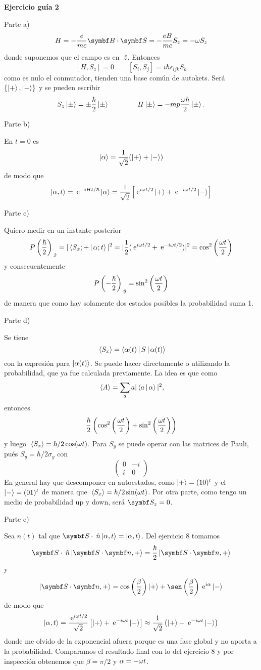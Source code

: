 \documentclass[10pt,oneside]{CBFT_book}
\begin{document}
\begin{ejemplo}{\bf Ejercicio guía 2}

Parte a)
\[
	H = -\frac{e}{mc} \pe{B}{S} = -\frac{eB}{mc} S_z = - \omega S_z
\]
donde suponemos que el campo es en $\:\hat{z}$.
Entonces
\[
	[H,S_z] = 0 \qquad [S_i,S_j] = i \hbar \epsilon_{ijk} S_k
\]
como es nulo el conmutador, tienden una base común de autokets. Será $\{ \Ket{+}, \Ket{-} \}$
y se pueden escribir
\[
	S_z \Ket{\pm} = \pm \frac{\hbar}{2}\Ket{\pm} \qquad \qquad 
	H \Ket{\pm} = -mp \frac{ \omega \hbar }{2} \Ket{\pm}.
\]

Parte b)

En $t=0$ es 
\[
	\Ket{\alpha} = \frac{1}{\sqrt{2}} ( \Ket{+} + \Ket{-} )
\]
de modo que
\[
	\Ket{\alpha,t} = \:\mathrm{e}^{ - i H t / \hbar } \Ket{\alpha} =
	\frac{1}{\sqrt{2}} \left[ \:\mathrm{e}^{ i \omega t / 2 } \Ket{+} + \:\mathrm{e}^{ -i \omega t / 2 } \Ket{-} \right] 
\]


Parte c)

Quiero medir en un instante posterior
\[
	P\left(\frac{\hbar}{2}\right)_{\:\hat{x}} = |\Braket{S_x;+|\alpha;t}|^2 = 
	| \frac{1}{2}( \:\mathrm{e}^{i \omega t / 2} +  \:\mathrm{e}^{-i \omega t / 2} ) |^2 = \cos^2\left( \frac{ \omega t }{ 2 } \right)
\]
y consecuentemente
\[
	P\left(-\frac{\hbar}{2}\right)_{\:\hat{y}} = \sin^2\left( \frac{ \omega t }{ 2 } \right)
\]
de manera que como hay solamente dos estados posibles la probabilidad suma 1.

Parte d)

Se tiene
\[
	\:\left\langle S_x \right\rangle = \Braket{\alpha(t) |S| \alpha(t)}
\]
con la expresión para $\Ket{\alpha(t)}$. Se puede hacer directamente o utilizando la probabilidad, que ya fue
calculada previamente. La idea es que como
\[
	\:\left\langle A \right\rangle = \sum_a a |\Braket{a|\alpha}|^2,
\]
entonces
\[
	\frac{\hbar}{2} \left( \cos^2\left( \frac{ \omega t }{ 2 } \right) + \sin^2\left( \frac{ \omega t }{ 2 } \right) \right)
\]
y luego $ \:\left\langle S_x \right\rangle = \hbar/2 \cos(\omega t)$.
Para $S_y$ se puede operar con las matrices de Pauli, pués $S_y = \hbar /2 \sigma_y$ con
\[
	\begin{pmatrix}
		0 & -i \\
		i &  0
	\end{pmatrix}
\]
En general hay que descomponer en autoestados, como $\Ket{+} = ( 1 0 )^t$ y el $\Ket{-} = ( 0 1 )^t$
de manera que $ \:\left\langle S_x \right\rangle = \hbar/2 \sin(\omega t) $.
Por otra parte, como tengo un medio de probabilidad up y down, será $\vb{S_z} = 0$.

Parte e)

Sea $n(t)$ tal que $\vb S \cdot \nver \Ket{\a,t} = \Ket{\a,t}$. Del ejercicio 8 tomamos
\[
	\vb S \cdot \nver \Ket{ \vb S\cdot\vb n, +} = \frac{\hbar}{2}\Ket{ \vb S\cdot\vb n, +}
\]
y
\[
	\Ket{ \vb S\cdot\vb n, +} = \cos\Frac{\b}{2} \Ket{+} + \sen\Frac{\b}{2} \euler^{i\a} \Ket{-}
\]
de modo que
\[
	\Ket{\alpha,t} = \frac{\:\mathrm{e}^{i\omega t/2}}{\sqrt{2}} \left[ \Ket{+} + \:\mathrm{e}^{-i\omega t} \Ket{-} \right]
	\approx \frac{1}{\sqrt{2}} \left( \Ket{+} + \:\mathrm{e}^{-i\omega t} \Ket{-} \right)
\]
donde me olvido de la exponencial afuera porque es una fase global y no aporta a la probabilidad.
Comparamos el resultado final con lo del ejercicio 8 y por inspección obtenemos que
$\beta = \pi/2$ y $\alpha = -\omega t$.
 

\end{ejemplo}
\end{document}
